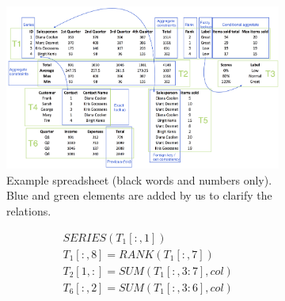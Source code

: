 \documentclass{sig-alternate-05-2015}
\newcommand{\range}[3]{\ensuremath{#1[#2,#3]}}
\newcommand{\rangeto}[2]{#1{:}#2}
\newcommand{\rangeall}{:}
\newcommand{\eccalc}[2]{\ensuremath{#1 = #2}}
\newcommand{\ecrank}[2]{\eccalc{#1}{\textit{RANK}(#2)}}
\newcommand{\ecseries}[1]{\ensuremath{\textit{SERIES}(#1)}}
\newcommand{\ecsumc}[2]{\eccalc{#1}{\textit{SUM}(#2, col)}}
\begin{document}

\begin{figure}[thb]

  \begin{subfigure}{.70\textwidth}
  \begin{center}
    \includegraphics[width=1\textwidth]{figures/Demo.png}
  \end{center}
  \vspace{-10pt}
  \caption{Example spreadsheet (black words and numbers only). Blue and green elements are added by us to clarify the relations.}
  \label{fig:main_example}
\end{subfigure}
\hfill
\begin{subfigure}{.30\textwidth}
  {\small
    \begin{align*}
      &~\ecseries{\range{T_{1}}{\rangeall}{1}} \\
%
      &~\ecrank{\range{T_{1}}{\rangeall}{8}}{\range{T_{1}}{\rangeall}{7}} \\
%
      &~\ecsumc{\range{T_{2}}{1}{\rangeall}}{\range{T_{1}}{\rangeall}{\rangeto{3}{7}}} \\
%
      &~\ecsumc{\range{T_{6}}{\rangeall}{2}}{\range{T_{1}}{\rangeall}{\rangeto{3}{6}}} \\

\end{align*}}
\end{subfigure}
\end{figure}
\end{document}
